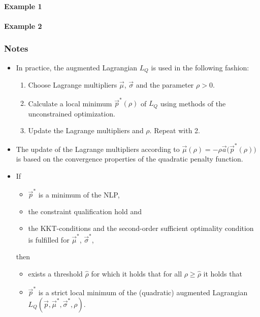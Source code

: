 			\paragraph{Example 1} %

			\paragraph{Example 2} %

			\subsubsection{Notes}
				\begin{itemize}
					\item In practice, the augmented Lagrangian \( L_Q \) is used in the following fashion:
						\begin{enumerate}
							\item Choose Lagrange multipliers \( \vec{\mu} \), \( \vec{\sigma} \) and the parameter \( \rho > 0 \).
							\item Calculate a local minimum \( \vec{p}^\ast(\rho) \) of \( L_Q \) using methods of the unconstrained optimization.
							\item Update the Lagrange multipliers and \(\rho\). Repeat with 2.
						\end{enumerate}
					\item The update of the Lagrange multipliers according to \( \vec{\mu}(\rho) = -\rho \vec{a}\big(\vec{p}^\ast(\rho)\big) \) is based on the convergence properties of the quadratic penalty function.
					\item If
						\begin{itemize}
							\item \(\vec{p}^\ast\) is a minimum of the NLP,
							\item the constraint qualification hold and
							\item the KKT-conditions and the second-order sufficient optimality condition is fulfilled for \( \vec{\mu}^\ast \), \( \vec{\sigma}^\ast \),
						\end{itemize}
						then
						\begin{itemize}
							\item exists a threshold \(\hat{\rho}\) for which it holds that for all \( \rho \geq \hat{\rho} \) it holds that
							\item \(\vec{p}^\ast\) is a strict local minimum of the (quadratic) augmented Lagrangian \( L_Q(\vec{p}, \vec{\mu}^\ast, \vec{\sigma}^\ast, \rho) \).
						\end{itemize}
				\end{itemize}

